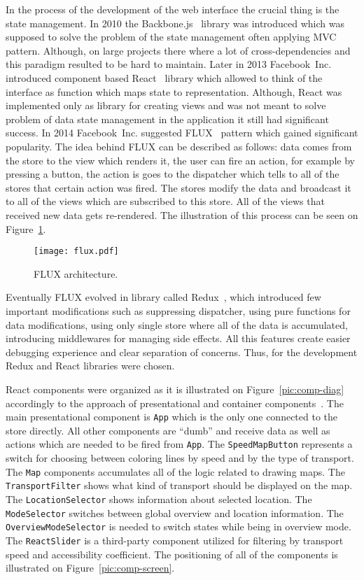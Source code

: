 In the process of the development of the web interface the crucial thing is the state management. In
2010 the Backbone.js~\cite{backbone} library was introduced which was supposed to solve the problem
of the state management often applying MVC~\cite{backbone:mvc} pattern. Although, on large projects
there where a lot of cross-dependencies and this paradigm resulted to be hard to maintain. Later in
2013 Facebook~Inc. introduced component based React~\cite{react} library which allowed to think of
the interface as function which maps state to representation. Although, React was implemented only
as library for creating views and was not meant to solve problem of data state management in the
application it still had significant success. In 2014 Facebook~Inc. suggested FLUX~\cite{flux}
pattern which gained significant popularity. The idea behind FLUX can be described as follows: data
comes from the store to the view which renders it, the user can fire an action, for example by
pressing a button, the action is goes to the dispatcher which tells to all of the stores that
certain action was fired. The stores modify the data and broadcast it to all of the views which are
subscribed to this store. All of the views that received new data gets re-rendered. The illustration
of this process can be seen on Figure~\ref{pic:flux}.

\begin{figure}[h]
  \centering
  \texttt{[image: flux.pdf]}
  \caption{FLUX architecture.}
  \label{pic:flux}
\end{figure}

Eventually FLUX evolved in library called Redux~\cite{redux}, which introduced few important
modifications such as suppressing dispatcher, using pure functions for data modifications, using
only single store where all of the data is accumulated, introducing middlewares for managing
side effects. All this features create easier debugging experience and clear separation
of concerns. Thus, for the development Redux and React libraries were chosen.

React components were organized as it is illustrated on Figure~\ref{pic:comp-diag} accordingly to
the approach of presentational and container components~\cite{redux:ppc}. The main presentational
component is \texttt{App} which is the only one connected to the store directly. All other
components are ``dumb'' and receive data as well as actions which are needed to be fired from
\texttt{App}. The \texttt{SpeedMapButton} represents a switch for choosing between coloring lines by
speed and by the type of transport. The \texttt{Map} components accumulates all of the logic related
to drawing maps. The \texttt{TransportFilter} shows what kind of transport should be displayed on
the map. The \texttt{LocationSelector} shows information about selected location. The
\texttt{ModeSelector} switches between global overview and location information. The
\texttt{OverviewModeSelector} is needed to switch states while being in overview mode. The
\texttt{ReactSlider} is a third-party component utilized for filtering by transport speed and
accessibility coefficient. The positioning of all of the components is illustrated on
Figure~\ref{pic:comp-screen}.



